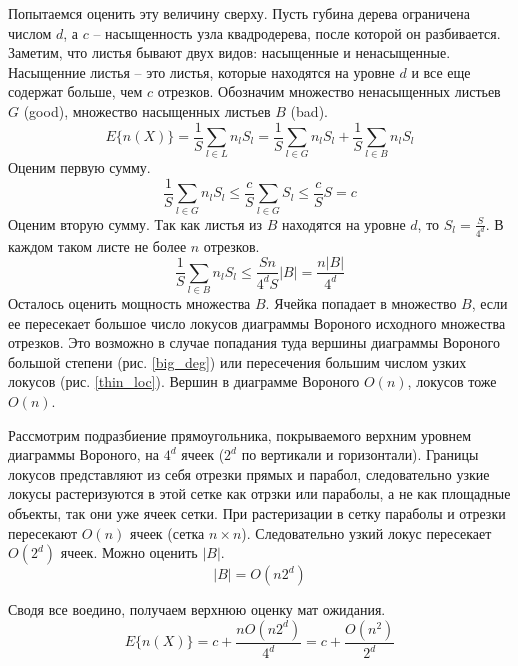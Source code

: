 Попытаемся оценить эту величину сверху. Пусть губина дерева ограничена числом $d$, 
а $c$ -- насыщенность узла квадродерева, после которой он разбивается.
Заметим, что листья бывают двух видов: насыщенные и ненасыщенные. Насыщенние листья -- это
листья, которые находятся на уровне $d$ и все еще содержат больше, чем $c$ отрезков.
Обозначим множество ненасыщенных листьев $G$ (good), множество насыщенных листьев $B$ (bad).
\begin{equation}
E\{n(X)\} = \frac{1}{S}\sum\limits_{l \in L}n_lS_l = 
\label{expectation}
\frac{1}{S}\sum\limits_{l \in G}n_lS_l 
+
\frac{1}{S}\sum\limits_{l \in B}n_lS_l
\end{equation}
Оценим первую сумму.
\begin{equation}
\frac{1}{S}\sum\limits_{l \in G}n_lS_l \le \frac{c}{S}\sum\limits_{l \in G}S_l \le \frac{c}{S}S = c
\label{sum1}
\end{equation}
Оценим вторую сумму. Так как листья из $B$ находятся на уровне $d$, то $S_l = \frac{S}{4^d}$.
В каждом таком листе не более $n$ отрезков.
\begin{equation}
\frac{1}{S}\sum\limits_{l \in B}n_lS_l \le \frac{Sn}{4^dS}|B| = \frac{n|B|}{4^d}
\label{sum2}
\end{equation}
Осталось оценить мощность множества $B$. Ячейка попадает в множество $B$, если ее пересекает
большое число локусов диаграммы Вороного исходного множества отрезков.
Это возможно в случае попадания туда вершины диаграммы Вороного большой степени (рис. \ref{big_deg})
или пересечения большим числом узких локусов (рис. \ref{thin_loc}). Вершин в диаграмме Вороного
$O(n)$, локусов тоже $O(n)$. 


Рассмотрим подразбиение прямоугольника, покрываемого верхним уровнем 
диаграммы Вороного, на $4^d$ ячеек ($2^d$ по вертикали и горизонтали).
Границы локусов представляют из себя отрезки прямых и парабол, следовательно
узкие локусы растеризуются в этой сетке как отрзки или параболы, а не как площадные объекты, 
так они уже ячеек сетки. При растеризации в сетку параболы и отрезки пересекают $O(n)$ ячеек (сетка $n \times n$).
Следовательно узкий локус пересекает $O(2^d)$ ячеек. Можно оценить $|B|$.
\begin{equation}
|B| = O(n2^d)
\label{bad_segs}
\end{equation}

Сводя все воедино, получаем верхнюю оценку мат ожидания.
\begin{equation}
E\{n(X)\} = c + \frac{nO(n2^d)}{4^d} = c + \frac{O(n^2)}{2^d}
\end{equation}

